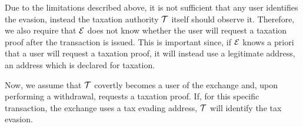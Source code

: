 Due to the limitations described above, it is not sufficient that any user
identifies the evasion, instead the taxation authority $\mathcal{T}$ itself should
observe it. Therefore, we also require that $\mathcal{E}$ does not know whether
the user will request a taxation proof after the transaction is issued. This is
important since, if $\mathcal{E}$ knows a priori that a user will request a
taxation proof, it will instead use a legitimate address, \ie an address which
is declared for taxation.

Now, we assume that $\mathcal{T}$ covertly becomes a user of the exchange and,
upon performing a withdrawal, requests a taxation proof. If, for this specific
transaction, the exchange uses a tax evading address, $\mathcal{T}$ will identify
the tax evasion.
